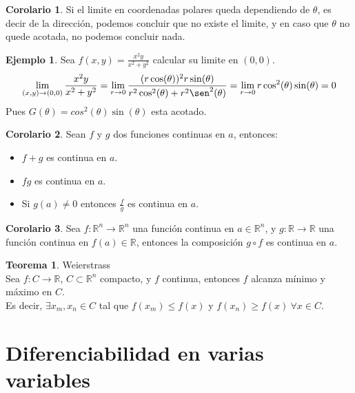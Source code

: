 \documentclass[10pt]{article}
\theoremstyle{definition}
\newtheorem{theorem}{Teorema}[section]
\newtheorem{corollary}{Corolario}[theorem]
\newtheorem{example}{Ejemplo}[section]
\begin{document}
\begin{corollary}
    Si el limite en coordenadas polares queda dependiendo de $\theta$, es decir de la dirección, podemos concluir que no existe el limite, y en caso que $\theta$ no quede acotada, no podemos concluir nada.
\end{corollary}
\begin{example}
    Sea $f(x,y)=\frac{x^2y}{x^2+y^2}$ calcular su limite en $(0,0)$.
    $$\lim_{(x,y) \to (0,0)}\frac{x^2y}{x^2+y^2}=\lim_{r \to 0}\frac{(r\cos(\theta))^2r\sin(\theta)}{r^2\cos^2(\theta)+r^2\sen^2(\theta)}=\lim_{r \to 0}r\cos^2(\theta)\sin(\theta)=0$$Pues $G(\theta)=cos^2(\theta)\sin(\theta)$ esta acotado.
\end{example}
\begin{corollary}
    Sean $f$ y $g$ dos funciones continuas en $a$, entonces:
    \begin{itemize}
        \item $f+g$ es continua en $a$.
        \item $f g$ es continua en $a$.
        \item Si $g(a)\neq 0$ entonces $\frac{f}{g}$ es continua en $a$.
    \end{itemize}
\end{corollary}
\begin{corollary}
    Sea $f:\mathbb{R}^n\to\mathbb{R}^n$ una función continua en $a\in\mathbb{R}^n$, y $g:\mathbb{R}\to\mathbb{R}$ una función continua en $f(a)\in\mathbb{R}$, entonces la composición $g\circ f$ es continua en $a$.
\end{corollary}
\begin{theorem}{Weierstrass}
    \\Sea $f:C\to\mathbb{R}$, $C\subset\mathbb{R}^n$ compacto, y $f$ continua, entonces $f$ alcanza mínimo y máximo en $C$.
    \\Es decir, $\exists x_m,x_n\in C$ tal que $f(x_m)\le f(x)$ y $f(x_n)\ge f(x)\ \forall x\in C$.
\end{theorem}
\newpage\section{Diferenciabilidad en varias variables}
\end{document}
